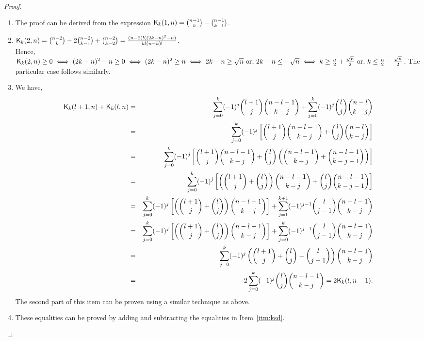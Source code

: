 \documentclass{llncs}
\begin{document}
\begin{proof}
\begin{enumerate}
\item The proof can be derived from the expression $\mathsf{K}_{k}(1,n) = {n-1 \choose k} - {n-1 \choose k-1}$.
\item $\mathsf{K}_{k}(2,n) = {n-2 \choose k} - 2{n-2 \choose k-1} + {n-2 \choose k-2} = \frac{(n-2)!((2k-n)^2-n)}{k!(n-k)!}$.\\
Hence, $\mathsf{K}_{k}(2,n) \geq 0 \iff (2k-n)^2-n \geq 0 \iff (2k-n)^2 \geq n \iff 2k-n \geq \sqrt{n} \text{ or, } 2k-n \leq -\sqrt{n} \iff k \geq \frac{n}{2}+\frac{\sqrt{n}}{2} \text{ or, } k \leq \frac{n}{2}-\frac{\sqrt{n}}{2}$.
The particular case follows similarly.
\item We have,
\begin{eqnarray*}
 \kraw{k}{l+1}{n} + \kraw{k}{l}{n} & = & \sum_{j=0}^k (-1)^j{l+1 \choose j} {n-l-1 \choose k-j} + \sum_{j=0}^k(-1)^j{l \choose j} {n-l \choose k-j} \\
% 
 & = & \sum_{j=0}^k(-1)^j\left[{l+1 \choose j} {n-l-1 \choose k-j} + {l \choose j} {n-l \choose k-j}\right] \\
% 
 & = & \sum_{j=0}^k(-1)^j\left[{l+1 \choose j} {n-l-1 \choose k-j} + {l \choose j} \left({n-l-1 \choose k-j} + {n-l-1 \choose k-j-1}\right)\right] \\ 
 & = & \sum_{j=0}^k(-1)^j\left[\left({l+1 \choose j} + {l \choose j}\right){n-l-1 \choose k-j} + {l \choose j} {n-l-1 \choose k-j-1}\right]\\
  & = & \sum_{j=0}^k(-1)^j\left[\left({l+1 \choose j} + {l \choose j}\right){n-l-1 \choose k-j} \right]
  + \sum_{j=1}^{k+1}(-1)^{j-1}{l \choose j-1} {n-l-1 \choose k-j}\\
 & = & \sum_{j=0}^k(-1)^j\left[\left({l+1 \choose j} + {l \choose j}\right){n-l-1 \choose k-j}  \right]+ \sum_{j=0}^k(-1)^{j-1}{l \choose j-1} {n-l-1 \choose k-j}\\
 & = & \sum_{j=0}^k(-1)^j\left({l+1 \choose j} + {l \choose j}-{l \choose j-1}\right){n-l-1 \choose k-j}\\
 & = & 2\sum_{j=0}^k(-1)^j {l \choose j}{n-l-1 \choose k-j} = 2\kraw{k}{l}{n-1}.
\end{eqnarray*}
The second part of this item can be proven using a similar technique as above.
\item These equalities can be proved by adding and subtracting the equalities in Item~\ref{itm:ksd}.
\end{enumerate}
\end{proof}
\end{document}
